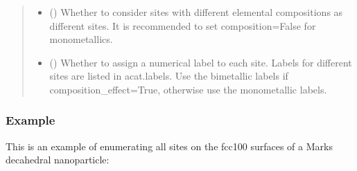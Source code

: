 \documentclass[letterpaper,10pt,english]{sphinxmanual}
\begin{document}
\begin{fulllineitems}
\begin{quote}
\begin{description}
\begin{itemize}
\item {} 
 (\sphinxstyleliteralemphasis{\sphinxupquote{, }}) \textendash{} Whether to consider sites with different elemental
compositions as different sites. It is recommended to
set composition=False for monometallics.

\item {} 
 (\sphinxstyleliteralemphasis{\sphinxupquote{, }}) \textendash{} Whether to assign a numerical label to each site.
Labels for different sites are listed in acat.labels.
Use the bimetallic labels if composition\_effect=True,
otherwise use the monometallic labels.

\end{itemize}

\end{description}\end{quote}
\subsubsection*{Example}

This is an example of enumerating all sites on the fcc100 surfaces
of a Marks decahedral nanoparticle:


\end{fulllineitems}
\end{document}
